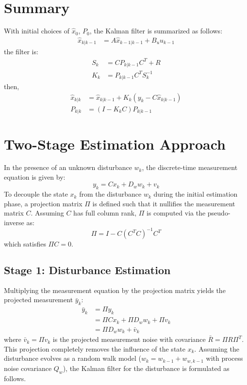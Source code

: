 \documentclass{article}
\begin{document}
\section{Summary}
With initial choices of $\hat{x}_0$, $P_0$, the Kalman filter is summarized as follows:
\begin{align}
    \hat{x}_{k|k-1} &= A \hat{x}_{k-1|k-1} + B_u u_{k-1}
\end{align}
the filter is:
\begin{align}
    S_k &= C P_{k|k-1} C^T + R\\
    K_k &= P_{k|k-1} C^T S_k^{-1}
\end{align}
then,
\begin{align}
    \hat{x}_{k|k} &= \hat{x}_{k|k-1} + K_k \left( y_k - C \hat{x}_{k|k-1} \right)\\
    P_{k|k} &= (I-K_k C) P_{k|k-1}
\end{align}


\section{Two-Stage Estimation Approach}
In the presence of an unknown disturbance $w_k$, the discrete-time measurement equation is given by:
\begin{equation}
    y_k = C x_k + D_w w_k + v_k
\end{equation}
To decouple the state $x_k$ from the disturbance $w_k$ during the initial estimation phase, a projection matrix $\Pi$ is defined such that it nullifies the measurement matrix $C$. Assuming $C$ has full column rank, $\Pi$ is computed via the pseudo-inverse as:
\begin{equation}
    \Pi = I - C (C^T C)^{-1} C^T
\end{equation}
which satisfies $\Pi C = 0$. 

\subsection{Stage 1: Disturbance Estimation}
Multiplying the measurement equation by the projection matrix yields the projected measurement $\bar{y}_k$:
\begin{align}
    \bar{y}_k &= \Pi y_k \\
    &= \Pi C x_k + \Pi D_w w_k + \Pi v_k \\
    &= \Pi D_w w_k + \bar{v}_k
\end{align}
where $\bar{v}_k = \Pi v_k$ is the projected measurement noise with covariance $\bar{R} = \Pi R \Pi^T$. This projection completely removes the influence of the state $x_k$. Assuming the disturbance evolves as a random walk model ($w_k = w_{k-1} + w_{w,k-1}$ with process noise covariance $Q_w$), the Kalman filter for the disturbance is formulated as follows.
\end{document}
